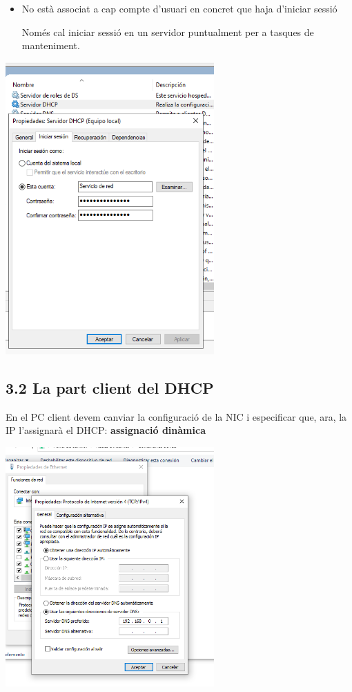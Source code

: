 \documentclass[
  a4paper,
]{article}
\begin{document}
\begin{itemize}
\item
  No està associat a cap compte d'usuari en concret que haja d'iniciar
  sessió

  Només cal iniciar sessió en un servidor puntualment per a tasques de
  manteniment.
\end{itemize}

\includegraphics[width=0.6\textwidth,height=\textheight]{png/ServiciDHCP2.png}

\subsection{3.2 La part client del DHCP}\label{la-part-client-del-dhcp}

En el PC client devem canviar la configuració de la NIC i especificar
que, ara, la IP l'assignarà el DHCP: \textbf{assignació dinàmica}

\includegraphics[width=0.6\textwidth,height=\textheight]{png/DHCP14.png}
\end{document}
